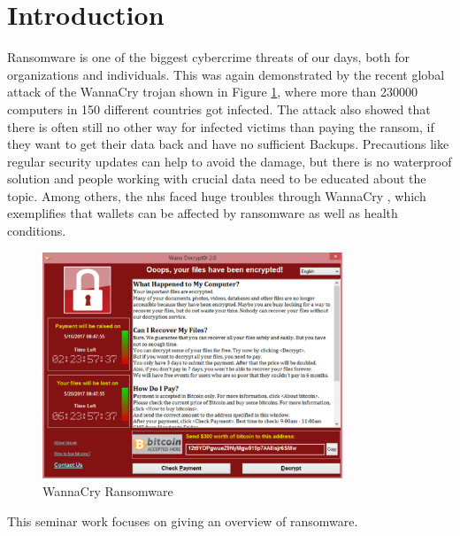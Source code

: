 \section{Introduction}

Ransomware is one of the biggest cybercrime threats of our days, both for organizations and individuals. This was again demonstrated by the recent global attack of the WannaCry trojan \cite{Symantec2017} shown in Figure \ref{fig:wanna_cry}, where more than 230000 computers in 150 different countries got infected. The attack also showed that there is often still no other way for infected victims than paying the ransom, if they want to get their data back and have no sufficient Backups. Precautions like regular security updates can help to avoid the damage, but there is no waterproof solution and people working with crucial data need to be educated about the topic. Among others, the \gls{nhs} faced huge troubles through WannaCry \cite{Martin2017}, which exemplifies that wallets can be affected by ransomware as well as health conditions.

\begin{figure}[htbp]
  \begin{center}
    \includegraphics[width=0.8\textwidth]{images/wanna_cry.png}
    \caption{WannaCry Ransomware}
    \label{fig:wanna_cry}
  \end{center}
\end{figure}

This seminar work focuses on giving an overview of ransomware.
